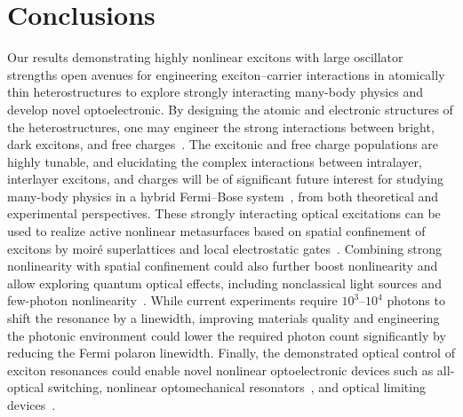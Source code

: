 \newpage
\section{Conclusions}
Our results demonstrating highly nonlinear excitons with large oscillator strengths open avenues for engineering exciton--carrier interactions in atomically thin heterostructures to explore strongly interacting many-body physics and develop novel optoelectronic. 
By designing the atomic and electronic structures of the heterostructures, one may engineer the strong interactions between bright, dark excitons, and free charges~\cite{Erkensten2021-mm}. 
The excitonic and free charge populations are highly tunable, and elucidating the complex interactions between intralayer, interlayer excitons, and charges will be of significant future interest for studying many-body physics in a hybrid Fermi--Bose system~\cite{Park2023-fb,Gao2024-ew,Xiong2023-ph}, from both theoretical and experimental perspectives. 
These strongly interacting optical excitations can be used to realize active nonlinear metasurfaces based on spatial confinement of excitons by moiré superlattices and local electrostatic gates~\cite{Koshelev2020-at,Bekenstein2019-ta,Cai2018-fw}. 
Combining strong nonlinearity with spatial confinement could also further boost nonlinearity and allow exploring quantum optical effects, including nonclassical light sources and few-photon nonlinearity~\cite{Wild2018-ee,Yu2017-so}. 
While current experiments require $10^3$--$10^4$ photons to shift the resonance by a linewidth, improving materials quality and engineering the photonic environment could lower the required photon count significantly by reducing the Fermi polaron linewidth. 
Finally, the demonstrated optical control of exciton resonances could enable novel nonlinear optoelectronic devices such as all-optical switching, nonlinear optomechanical resonators~\cite{Zhou2020-tk,Aspelmeyer2014-zi}, and optical limiting devices~\cite{Volz2012-pb,W1988-yk}.